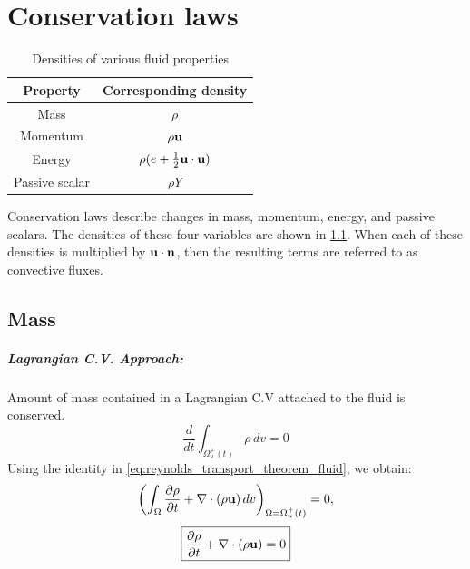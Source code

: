 \documentclass[oneside,a4paper,11pt]{report}
\begin{document}
\chapter{Conservation laws}
\begin{table}
    \centering
    \caption{Densities of various fluid properties}
    \label{tab:property_densities}
    \def\arraystretch{1.5}
    \begin{tabular}{|c|c|}
        \hline
        Property & Corresponding density  \\
        \hline
        Mass & $\rho$  \\
        \hline
        Momentum & $\rho \mathbf{u}$ \\ 
        \hline
        Energy & $\rho (e+\frac{1}{2}\mathbf{u} \cdot \mathbf{u} )$ \\
        \hline
        Passive scalar & $\rho Y$ \\
        \hline
    \end{tabular}
\end{table}
Conservation laws describe changes in mass, momentum, energy, and passive scalars. The densities of these four variables are shown in \cref{tab:property_densities}. When each of these densities is multiplied by $\mathbf{u} \cdot \mathbf{n}$, then the resulting terms are referred to as convective fluxes.

\section{Mass}
\paragraph{Lagrangian C.V. Approach:}
Amount of mass contained in a Lagrangian C.V attached to the fluid is conserved.
\begin{equation}
    \frac{d}{dt}\int_{\Omega^+_u(t)} \rho \,dv = 0
\end{equation}
Using the identity in \cref{eq:reynolds_transport_theorem_fluid}, we obtain:
\begin{equation}
\left ( \int_{\Omega} \frac{\partial\rho}{\partial t}+\nabla \cdot (\rho \mathbf{u})\,dv \right)_{\Omega = \Omega^+_u(t)} =0,
\end{equation}
\begin{equation}
\boxed{\frac{\partial\rho}{\partial t}+\nabla \cdot (\rho \mathbf{u})=0}
\end{equation}
\end{document}
